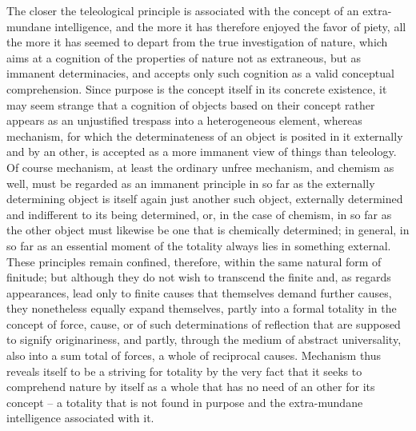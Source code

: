 The closer the teleological principle is associated with the concept of an
extra-mundane intelligence, and the more it has therefore enjoyed the favor
of piety, all the more it has seemed to depart from the true investigation
of nature, which aims at a cognition of the properties of nature not as
extraneous, but as immanent determinacies, and accepts only such cognition
as a valid conceptual comprehension. Since purpose is the concept itself
in its concrete existence, it may seem strange that a cognition of objects
based on their concept rather appears as an unjustified trespass into a
heterogeneous element, whereas mechanism, for which the determinateness
of an object is posited in it externally and by an other, is accepted as a more
immanent view of things than teleology. Of course mechanism, at least the
ordinary unfree mechanism, and chemism as well, must be regarded as an
immanent principle in so far as the externally determining object is itself
again just another such object, externally determined and indifferent to its
being determined, or, in the case of chemism, in so far as the other object
must likewise be one that is chemically determined; in general, in so far
as an essential moment of the totality always lies in something external.
These principles remain confined, therefore, within the same natural form
of finitude; but although they do not wish to transcend the finite and,
as regards appearances, lead only to finite causes that themselves demand
further causes, they nonetheless equally expand themselves, partly into a
formal totality in the concept of force, cause, or of such determinations of
reflection that are supposed to signify originariness, and partly, through the
medium of abstract universality, also into a sum total of forces, a whole of
reciprocal causes. Mechanism thus reveals itself to be a striving for totality
by the very fact that it seeks to comprehend nature by itself as a whole that
has no need of an other for its concept – a totality that is not found in
purpose and the extra-mundane intelligence associated with it.

